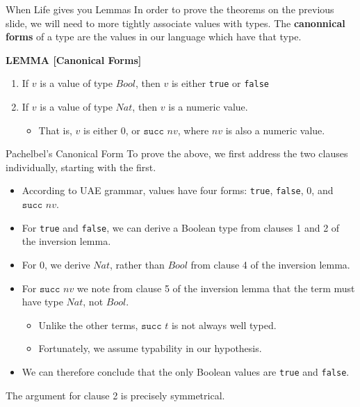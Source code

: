 \documentclass[11pt]{beamer}
\begin{document}
\begin{frame}[fragile=singleslide]{When Life gives you Lemmas}
In order to prove the theorems on the previous slide, we will need to more tightly associate values with types.  The \textbf{canonnical forms} of a type are the values in our language which have that type.  \\
\vspace{1em}

\textbf{LEMMA [Canonical Forms]}
\begin{enumerate}
\item If $v$ is a value of type $Bool$, then $v$ is either \texttt{true} or \texttt{false}
\item If $v$ is a value of type $Nat$, then $v$ is a numeric value. 
\begin{itemize}
\item That is, $v$ is either $0$, or $\texttt{succ } nv$, where $nv$ is also a numeric value.
\end{itemize}
\end{enumerate}

\end{frame}

\begin{frame}[fragile=singleslide]{Pachelbel's Canonical Form}
To prove the above, we first address the two clauses individually, starting with the first.
\begin{itemize}
\item According to UAE grammar, values have four forms: \texttt{true}, \texttt{false}, $0$, and $\texttt{succ } nv$.
\item For \texttt{true} and \texttt{false}, we can derive a Boolean type from clauses 1 and 2 of the inversion lemma. 
\item For $0$, we derive $Nat$, rather than $Bool$ from clause 4 of the inversion lemma.
\item For $\texttt{succ } nv$ we note from clause 5 of the inversion lemma that the term must have type $Nat$, not $Bool$. 
\begin{itemize}
\item Unlike the other terms, $\texttt{succ } t$ is not always well typed.
\item Fortunately, we assume typability in our hypothesis.
\end{itemize}
\item We can therefore conclude that the only Boolean values are \texttt{true} and \texttt{false}.
\end{itemize}
The argument for clause 2 is precisely symmetrical.  
\end{frame}
\end{document}
